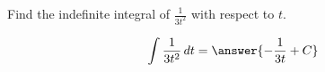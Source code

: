 \documentclass{ximera}
\author{Gregory Hartman \and Matthew Carr}
\begin{document}
\begin{exercise}


Find the indefinite integral of $\frac{1}{3t^2}$ with respect to $t$.

\[
\int \frac{1}{3t^2}\d t=\answer{-\frac{1}{3t}+C}
\]


\end{exercise}
\end{document}
